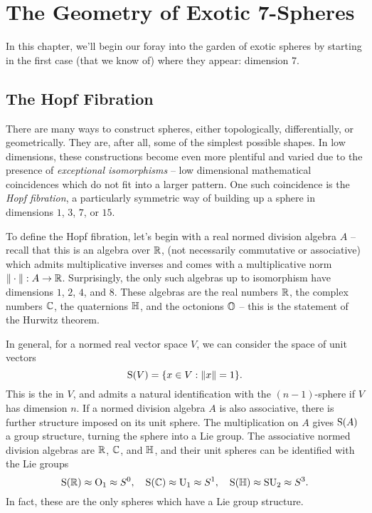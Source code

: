 \chapter{The Geometry of Exotic 7-Spheres}

In this chapter, we'll begin our foray into the garden of exotic spheres by starting in the first case (that we know of) where they appear: dimension 7. 

\section{The Hopf Fibration}

There are many ways to construct spheres, either topologically, differentially, or geometrically. They are, after all, some of the simplest possible shapes. In low dimensions, these constructions become even more plentiful and varied due to the presence of \emph{exceptional isomorphisms} -- low dimensional mathematical coincidences which do not fit into a larger pattern. One such coincidence is the \emph{Hopf fibration}, a particularly symmetric way of building up a sphere in dimensions $1$, $3$, $7$, or $15$.

To define the Hopf fibration, let's begin with a real normed division algebra $A$ -- recall that this is an algebra over $\R$, (not necessarily commutative or associative) which admits multiplicative inverses and comes with a multiplicative norm $\|\cdot\| : A \to \R$. Surprisingly, the only such algebras up to isomorphism have dimensions $1$, $2$, $4$, and $8$. These algebras are the real numbers $\R$, the complex numbers $\C$, the quaternions $\HH$, and the octonions $\OO$ -- this is the statement of the Hurwitz theorem.

In general, for a normed real vector space $V$, we can consider the space of unit vectors
\[
    \S(V) = \{ x\in V : \|x\| = 1\}.
\]
This is the  in $V$, and admits a natural identification with the $(n-1)$-sphere if $V$ has dimension $n$. If a normed division algebra $A$ is also associative, there is further structure imposed on its unit sphere. The multiplication on $A$ gives $\S(A)$ a group structure, turning the sphere into a Lie group. The associative normed division algebras are $\R$, $\C$, and $\HH$, and their unit spheres can be identified with the Lie groups
\[
    \S(\R)\approx \O_1\approx S^0,\quad \S(\C)\approx \U_1\approx S^1, \quad \S(\HH)\approx \SU_2\approx S^3.
\]
In fact, these are the only spheres which have a Lie group structure.

